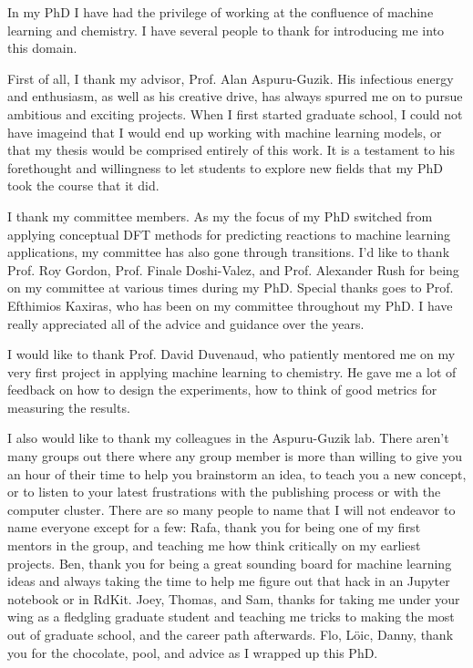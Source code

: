 In my PhD I have had the privilege of working at the confluence of machine learning and chemistry. I have several people to thank for introducing me into this domain.

First of all, I thank my advisor, Prof. Alan Aspuru-Guzik. His infectious energy and enthusiasm, as well as his creative drive, has always spurred me on to pursue ambitious and exciting projects. When I first started graduate school, I could not have imageind that I would end up working with machine learning models, or that my thesis would be comprised entirely of this work. It is a testament to his forethought and willingness to let students to explore new fields that my PhD took the course that it did.

I thank my committee members. As my the focus of my PhD switched from applying conceptual DFT methods for predicting reactions to machine learning applications, my committee has also gone through transitions. I'd like to thank Prof. Roy Gordon, Prof. Finale Doshi-Valez, and Prof. Alexander Rush for being on my committee at various times during my PhD. Special thanks goes to Prof. Efthimios Kaxiras, who has been on my committee throughout my PhD. I have really appreciated all of the advice and guidance over the years.

I would like to thank Prof. David Duvenaud, who patiently mentored me on my very first project in applying machine learning to chemistry. He gave me a lot of feedback on how to design the experiments, how to think of good metrics for measuring the results.

I also would like to thank my colleagues in the Aspuru-Guzik lab.  There aren't many groups out there where any group member is more than willing to give you an hour of their time to help you brainstorm an idea, to teach you a new concept, or to listen to your latest frustrations with the publishing process or with the computer cluster. There are so many people to name that I will not endeavor to name everyone except for a few: Rafa, thank you for being one of my first mentors in the group, and teaching me how think critically on my earliest projects. Ben, thank you for being a great sounding board for machine learning ideas and always taking the time to help me figure out that hack in an Jupyter notebook or in RdKit. Joey, Thomas, and Sam, thanks for taking me under your wing as a fledgling graduate student and teaching me tricks to making the most out of graduate school, and the career path afterwards. Flo, L{\"o}ic, Danny, thank you for the chocolate, pool, and advice as I wrapped up this PhD.

